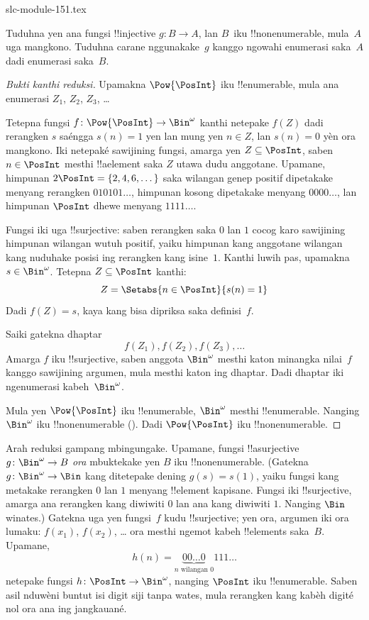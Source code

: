 \begin{filecontents*}[overwrite]{slc-module-151.tex}
\begin{prob}
Tuduhna yen ana fungsi !!{injective} $g\colon B \to A$, lan
$B$~iku !!{nonenumerable}, mula~$A$ uga mangkono. Tuduhna carane
nggunakake~$g$ kanggo ngowahi enumerasi saka~$A$ dadi enumerasi saka~$B$.
\end{prob}

\begin{proof}[Bukti {} kanthi reduksi]
Upamakna $\Pow{\PosInt}$ iku !!{enumerable}, mula ana
enumerasi $Z_{1}$, $Z_{2}$, $Z_{3}$, \dots

Tetepna fungsi $f \colon \Pow{\PosInt} \to \Bin^\omega$ kanthi netepake
$f(Z)$ dadi rerangken $s$ saéngga $s(n) = 1$ yen lan mung yen $n \in Z$,
lan $s(n) = 0$ yèn ora mangkono. Iki netepaké sawijining fungsi,
amarga yen $Z \subseteq \PosInt$, saben $n \in \PosInt$ mesthi
!!a{element} saka $Z$ utawa dudu anggotane. Upamane, himpunan $2\PosInt = \{2,
4, 6, \dots\}$ saka wilangan genep positif dipetakake menyang rerangken
$010101\dots$, himpunan kosong dipetakake menyang $0000\dots$, lan
himpunan $\PosInt$ dhewe menyang $1111\dots$.

Fungsi iki uga !!{surjective}: saben rerangken saka $0$ lan $1$ cocog
karo sawijining himpunan wilangan wutuh positif, yaiku himpunan kang
anggotane wilangan kang nuduhake posisi ing rerangken kang isine~$1$.
Kanthi luwih pas, upamakna $s \in \Bin^\omega$. Tetepna $Z
\subseteq \PosInt$ kanthi:
\[
Z = \Setabs{n \in \PosInt}{s(n) = 1}
\]
Dadi $f(Z) = s$, kaya kang bisa dipriksa saka definisi~$f$.

Saiki gatekna dhaptar
\[
f(Z_1), f(Z_2), f(Z_3), \dots
\]
Amarga $f$ iku !!{surjective}, saben anggota $\Bin^\omega$ mesthi
katon minangka nilai~$f$ kanggo sawijining argumen, mula mesthi
katon ing dhaptar. Dadi dhaptar iki ngenumerasi kabeh~$\Bin^\omega$.

Mula yen $\Pow{\PosInt}$ iku !!{enumerable}, $\Bin^\omega$ mesthi
!!{enumerable}. Nanging $\Bin^\omega$ iku !!{nonenumerable}
(). Dadi $\Pow{\PosInt}$ iku
!!{nonenumerable}.
\end{proof}

\begin{explain}
Arah reduksi gampang mbingungake.
Upamane, fungsi !!a{surjective} $g \colon \Bin^\omega \to B$
\emph{ora} mbuktekake yen $B$ iku !!{nonenumerable}. (Gatekna $g
\colon \Bin^\omega \to \Bin$ kang ditetepake dening $g(s) = s(1)$,
yaiku fungsi kang metakake rerangken $0$ lan $1$ menyang !!{element} kapisane.
Fungsi iki !!{surjective}, amarga ana rerangken kang diwiwiti $0$ lan
ana kang diwiwiti $1$. Nanging $\Bin$ winates.) Gatekna uga yen fungsi~$f$
kudu !!{surjective}; yen ora, argumen iki ora lumaku:
$f(x_1)$, $f(x_2)$, \dots{} ora mesthi ngemot
kabeh !!{element}s saka~$B$. Upamane,
\[
h(n) = \underbrace{00\dots0}_{\text{$n$ wilangan $0$}}111\dots
\]
netepake fungsi $h\colon \PosInt \to
\Bin^\omega$, nanging $\PosInt$ iku !!{enumerable}.
Saben asil nduwèni buntut isi digit siji tanpa wates, mula rerangken
kang kabèh digité nol ora ana ing jangkauané.
\end{explain}


\end{filecontents*}
